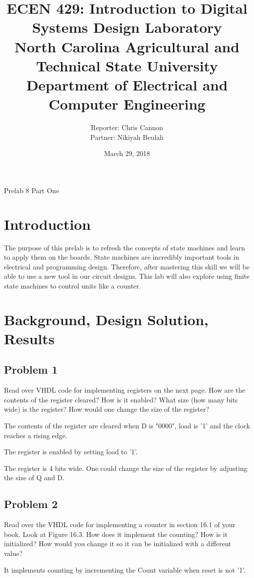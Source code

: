 \documentclass[11pt]{article}
\title {{\titleFont ECEN 429: Introduction to Digital Systems Design Laboratory \\ North Carolina Agricultural and Technical State University \\ Department of Electrical and Computer Engineering}} %
\author{\titleFont Reporter: Chris Cannon \\ Partner: Nikiyah Beulah} %
\date{\titleFont March 29, 2018}
\begin{document}
\begin{titlingpage}
\maketitle
\begin{center}
	Prelab 8 Part One
\end{center}
\end{titlingpage}

\section{Introduction}
The purpose of this prelab is to refresh the concepts of state machines and learn to apply them on the boards. State machines are incredibly important tools in electrical and programming design. Therefore, after mastering this skill we will be able to use a new tool in our circuit designs. This lab will also explore using finite state machines to control units like a counter.

\section{Background, Design Solution, Results}
\subsection{Problem 1}
Read over VHDL code for implementing registers on the next page. How are the contents of the register cleared? How is it enabled? What size (how many bits wide) is the register? How would one change the size of the register?

The contents of the register are cleared when D is "0000", load is '1' and the clock reaches a rising edge.

The register is enabled by setting load to '1'.

The register is 4 bits wide. One could change the size of the register by adjusting the size of Q and D.

\subsection{Problem 2}
Read over the VHDL code for implementing a counter in section 16.1 of your book. Look at Figure 16.3. How does it implement the counting? How is it initialized? How would you change it so it can be initialized with a different value?

It implements counting by incrementing the Count variable when reset is not '1'.
\end{document}
